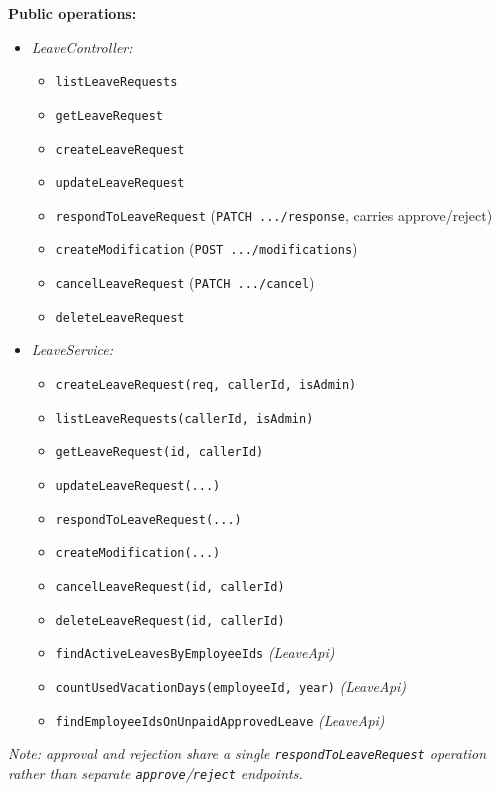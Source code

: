 \documentclass[11pt,a4paper]{article}
\begin{document}
\textbf{Public operations:}
\begin{itemize}[leftmargin=1.5em]
    \item \textit{LeaveController:}
    \begin{itemize}[noitemsep, leftmargin=1.5em]
        \item \texttt{listLeaveRequests}
        \item \texttt{getLeaveRequest}
        \item \texttt{createLeaveRequest}
        \item \texttt{updateLeaveRequest}
        \item \texttt{respondToLeaveRequest} (\texttt{PATCH .../response}, carries approve/reject)
        \item \texttt{createModification} (\texttt{POST .../modifications})
        \item \texttt{cancelLeaveRequest} (\texttt{PATCH .../cancel})
        \item \texttt{deleteLeaveRequest}
    \end{itemize}
    \item \textit{LeaveService:}
    \begin{itemize}[noitemsep, leftmargin=1.5em]
        \item \texttt{createLeaveRequest(req, callerId, isAdmin)}
        \item \texttt{listLeaveRequests(callerId, isAdmin)}
        \item \texttt{getLeaveRequest(id, callerId)}
        \item \texttt{updateLeaveRequest(...)}
        \item \texttt{respondToLeaveRequest(...)}
        \item \texttt{createModification(...)}
        \item \texttt{cancelLeaveRequest(id, callerId)}
        \item \texttt{deleteLeaveRequest(id, callerId)}
        \item \texttt{findActiveLeavesByEmployeeIds} \textit{(LeaveApi)}
        \item \texttt{countUsedVacationDays(employeeId, year)} \textit{(LeaveApi)}
        \item \texttt{findEmployeeIdsOnUnpaidApprovedLeave} \textit{(LeaveApi)}
    \end{itemize}
\end{itemize}

\textit{Note: approval and rejection share a single \texttt{respondToLeaveRequest} operation rather than separate \texttt{approve}/\texttt{reject} endpoints.}
\end{document}
